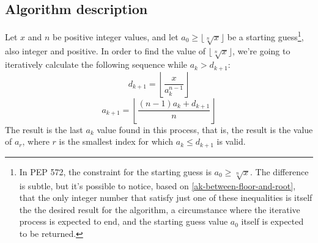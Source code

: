 \subsection*{Algorithm description}

Let $x$ and $n$ be positive integer values,
and let $a_0 \ge \lfloor \sqrt[n]{x} \rfloor$ be
a starting guess\footnote{
  In PEP 572,
  the constraint for the starting guess is $a_0 \ge \sqrt[n]{x}$.
  The difference is subtle, but it's possible to notice,
  based on \eqref{ak-between-floor-and-root},
  that the only integer number
  that satisfy just one of these inequalities
  is itself the the desired result for the algorithm,
  a circumstance where the iterative process is expected to end,
  and the starting guess value $a_0$ itself is expected to be returned.
},
also integer and positive.
In order to find the value of $\lfloor \sqrt[n]{x} \rfloor$,
we're going to iteratively calculate the following sequence
while $a_k > d_{k+1}$:
\[
  d_{k+1} = \left\lfloor \dfrac{x}{a_k^{n-1}} \right\rfloor
\]
\[
  a_{k+1} = \left\lfloor \dfrac{(n-1) a_k + d_{k+1}}{n} \right\rfloor
\]
The result is the last $a_k$ value found in this process,
that is, the result is the value of $a_r$,
where $r$ is the smallest index for which $a_k \le d_{k+1}$ is valid.
